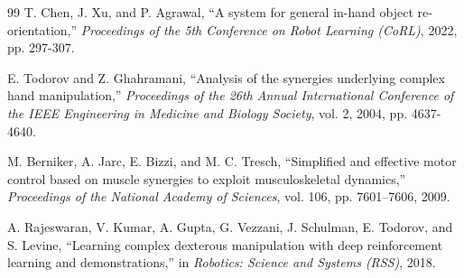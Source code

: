 \documentclass[letterpaper, 10 pt, conference]{ieeeconf}  %
\begin{document}
\begin{thebibliography}{99}
        T. Chen, J. Xu, and P. Agrawal, 
        ``A system for general in-hand object 
        re-orientation,'' 
        \emph{Proceedings of the 5th Conference on Robot Learning (CoRL)}, 2022, pp. 297-307.
                
        E. Todorov and Z. Ghahramani, 
        ``Analysis of the synergies underlying 
        complex hand manipulation,''  
        \emph{Proceedings of the 26th Annual International Conference of the IEEE Engineering in Medicine and 
        Biology Society},
        vol. 2, 2004, pp. 4637-4640.
        
        M. Berniker, A. Jarc, E. Bizzi, and M. C. Tresch, ``Simplified and 
        effective motor control based on muscle synergies to exploit 
        musculoskeletal dynamics,'' \emph{Proceedings of the National Academy 
        of Sciences}, vol. 106, pp. 7601--7606, 2009.

        A. Rajeswaran, V. Kumar, A. Gupta, G. Vezzani, J. Schulman, E. Todorov, and 
        S. Levine, ``Learning complex dexterous manipulation with deep reinforcement 
        learning and demonstrations,'' in \emph{Robotics: Science and Systems (RSS)}, 
        2018.

\end{thebibliography}
        
\end{document}
